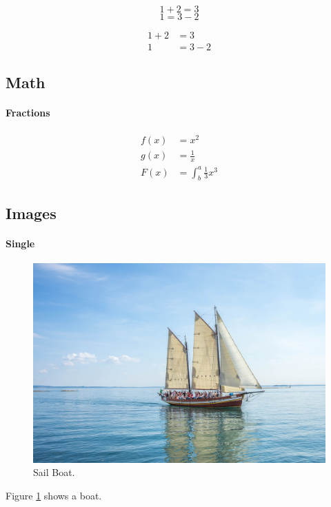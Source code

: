 \documentclass{article}
\begin{document}
\begin{equation*}
  1 + 2 = 3 
\end{equation*}
\begin{equation*}
  1 = 3 - 2
\end{equation*}

\begin{align*}
  1 + 2 &= 3\\
  1 &= 3 - 2
\end{align*}

\subsection{Math}

\paragraph{Fractions}
\begin{align*}
  f(x) &= x^2\\
  g(x) &= \frac{1}{x}\\
  F(x) &= \int^a_b \frac{1}{3}x^3
\end{align*}

\subsection{Images}

\paragraph{Single}

\begin{figure}
  \includegraphics[width=\linewidth]{boat.jpg}
  \caption{Sail Boat.}
  \label{fig:boat1}
\end{figure}

Figure \ref{fig:boat1} shows a boat.
\end{document}
